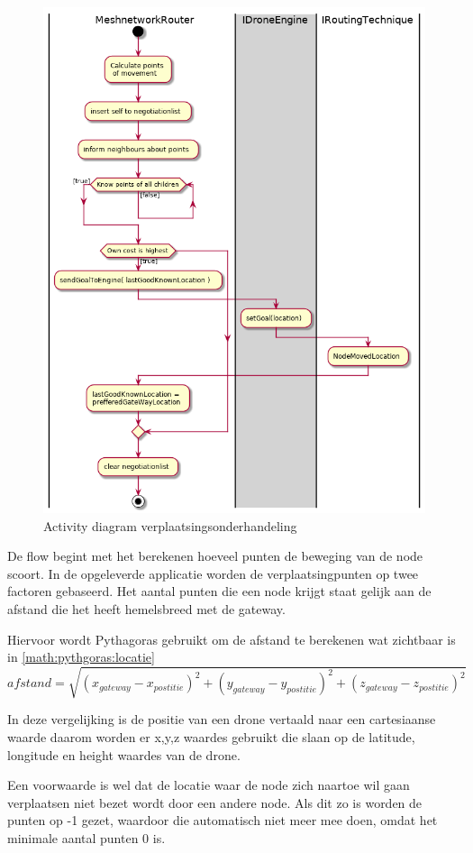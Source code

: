 \documentclass[a4paper, 11pt, oneside]{report}
\begin{document}
\begin{figure}[H]
	\begin{center}\includegraphics[width=.6\linewidth]{UML/out/Communication/activity/MovementNegotiation/MovementNegotiation.png}\end{center}
	\caption{Activity diagram verplaatsingsonderhandeling}
	\label{fig:communication:activity:verplaatsingsonderhandeling}
\end{figure}
De flow begint met het berekenen hoeveel punten de beweging van de node scoort.
In de opgeleverde applicatie worden de verplaatsingpunten op twee factoren gebaseerd.
Het aantal punten die een node krijgt staat gelijk aan de afstand die het heeft hemelsbreed met de gateway.

Hiervoor wordt Pythagoras gebruikt om de afstand te berekenen wat zichtbaar is in \autoref{math:pythgoras:locatie} 
\begin{equation}
\label{math:pythgoras:locatie}
afstand =   \sqrt{(x_{gateway} - x_{postitie})^2+(y_{gateway} - y_{postitie})^2+(z_{gateway} - z_{postitie})^2}							
\end{equation}

In deze vergelijking is de positie van een drone vertaald naar een cartesiaanse waarde daarom worden er x,y,z waardes gebruikt die slaan op de latitude, longitude en height waardes van de drone.

Een voorwaarde is wel dat de locatie waar de node zich naartoe wil gaan verplaatsen niet bezet wordt door een andere node. Als dit zo is worden de punten op -1 gezet, waardoor die automatisch niet meer mee doen, omdat het minimale aantal punten 0 is.
\end{document}
